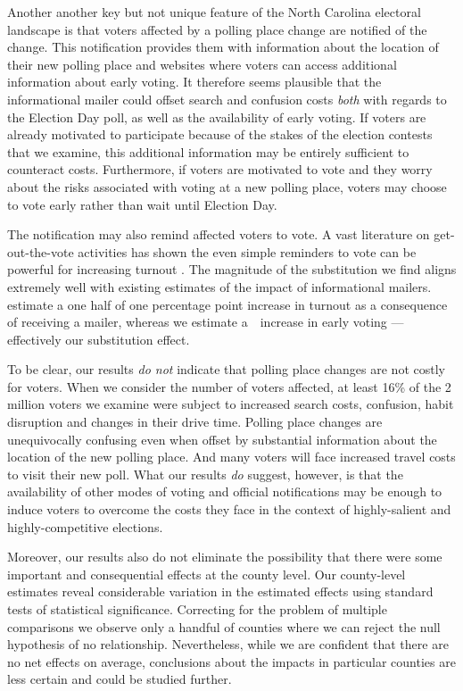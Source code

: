 \documentclass{cup_PSRM}
\begin{document}
Another another key but not unique feature of the North Carolina electoral landscape is that voters affected by a polling place change are notified of the change.  This notification provides them with information about the location of their new polling place and websites where voters can access additional information about early voting. It therefore seems plausible that the informational mailer could offset search and confusion costs \emph{both} with regards to the Election Day poll, as well as the availability of early voting.  If voters are already motivated to participate because of the stakes of the election contests that we examine, this additional information may be entirely sufficient to counteract costs. Furthermore, if voters are motivated to vote and they worry about the risks associated with voting at a new polling place, voters may choose to vote early rather than wait until Election Day.

The notification may also remind affected voters to vote.  A vast literature on get-out-the-vote activities has shown the even simple reminders to vote can be powerful for increasing turnout \citep{gerber2000effects}.  The magnitude of the substitution we find aligns extremely well with existing estimates of the impact of informational mailers.  \cite{gerber2000effects} estimate a one half of one percentage point increase in turnout as a consequence of receiving a mailer, whereas we estimate a~\unskip~increase in early voting --- effectively our substitution effect.

To be clear, our results \emph{do not} indicate that polling place changes are not costly for voters.  When we consider the number of voters affected, at least 16\% of the 2 million voters we examine were subject to increased search costs, confusion, habit disruption and changes in their drive time.  Polling place changes are unequivocally confusing even when offset by substantial information about the location of the new polling place.  And many voters will face increased travel costs to visit their new poll.  What our results \emph{do} suggest, however, is that the availability of other modes of voting and official notifications may be enough to induce voters to overcome the costs they face in the context of highly-salient and highly-competitive elections.

Moreover, our results also do not eliminate the possibility that there were some important and consequential effects at the county level.  Our county-level estimates reveal considerable variation in the estimated effects using standard tests of statistical significance. Correcting for the problem of multiple comparisons we observe only a handful of counties where we can reject the null hypothesis of no relationship.  Nevertheless, while we are confident that there are no net effects on average, conclusions about the impacts in particular counties are less certain and could be studied further.
\end{document}
